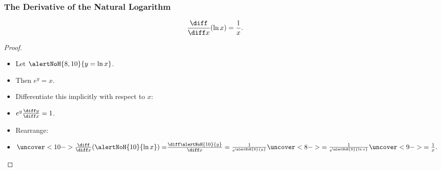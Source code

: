 \begin{frame}
\frametitle{The Derivative of the Natural Logarithm}
\begin{theorem}
\[
\frac{\diff}{\diff x} (\ln x) = \frac{1}{x} .
\]
\end{theorem}
\begin{proof}
\begin{itemize}
\item<2->  Let $\alertNoH{ 8,10}{y = \ln x}$.
\item<3->  Then $e^y = x$.
\item<4->  Differentiate this implicitly with respect to $x$:
\item<5->  $e^y \frac{\diff y}{\diff x} = 1$.
\item<6->  Rearrange:
\item<7->  $\uncover<10->{\frac{\diff}{\diff x} (\alertNoH{ 10}{\ln x}) = } \frac{\diff \alertNoH{ 10}{y}}{\diff x} = \frac{1}{e^{\alertNoH{ 8}{y}}} \uncover<8->{ = \frac{1}{e^{\alertNoH{ 8}{\ln x}}}} \uncover<9->{ = \frac{1}{x}.}$
\end{itemize}
\end{proof}
\end{frame}
